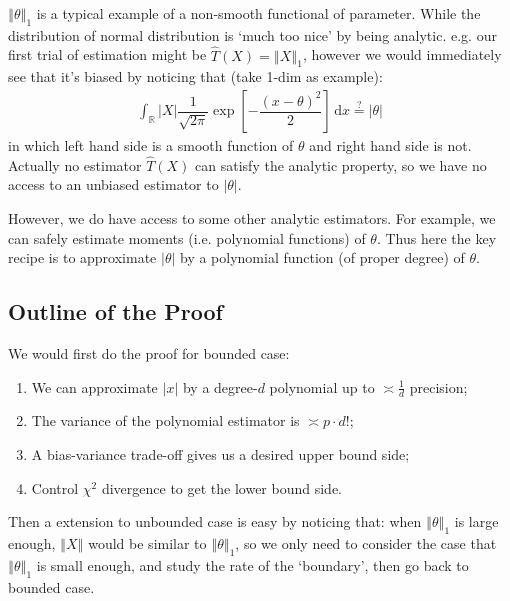 \documentclass[11pt,a4paper]{article}
\numberwithin{equation}{section}%
\begin{document}
$ \left\Vert \theta  \right\Vert _1 $ is a typical example of a non-smooth functional of parameter. While the distribution of normal distribution is `much too nice' by being analytic. e.g. our first trial of estimation might be $ \hat{T}(X)=\left\Vert X \right\Vert _1  $, however we would immediately see that it's biased by noticing that (take 1-dim as example):
\begin{align*}
    \int _\mathbb{R} \left\vert X \right\vert \dfrac{ 1 }{ \sqrt{2\pi} }\exp\left[ -\dfrac{ (x-\theta ) ^2}{ 2 }  \right]  \,\mathrm{d}x \mathop{ = }\limits^{?}\left\vert \theta  \right\vert   
\end{align*}
in which left hand side is a smooth function of $ \theta  $ and right hand side is not. Actually no estimator $ \hat{T}(X) $ can satisfy the analytic property, so we have no access to an unbiased estimator to $ \left\vert \theta  \right\vert  $.

However, we do have access to some other analytic estimators. For example, we can safely estimate moments (i.e. polynomial functions) of $ \theta $. Thus here the key recipe is to approximate $ \left\vert \theta  \right\vert  $ by a polynomial function (of proper degree) of $ \theta  $.



\subsection{Outline of the Proof}
We would first do the proof for bounded case:
\begin{enumerate}[topsep=2pt,itemsep=2pt]
    \item We can approximate $ \left\vert x \right\vert  $ by a degree-$ d $ polynomial up to $ \asymp \frac{1}{d} $ precision;
    \item The variance of the polynomial estimator is $ \asymp p\cdot d! $;
    \item A bias-variance trade-off gives us a desired upper bound side;
    \item Control $ \chi^2 $ divergence to get the lower bound side.
\end{enumerate}
Then a extension to unbounded case is easy by noticing that: when $ \left\Vert \theta  \right\Vert _1 $ is large enough, $ \left\Vert X  \right\Vert   $ would be similar to $ \left\Vert \theta  \right\Vert _1 $, so we only need to consider the case that $ \left\Vert \theta  \right\Vert _1 $ is small enough, and study the rate of the `boundary', then go back to bounded case.
\end{document}
